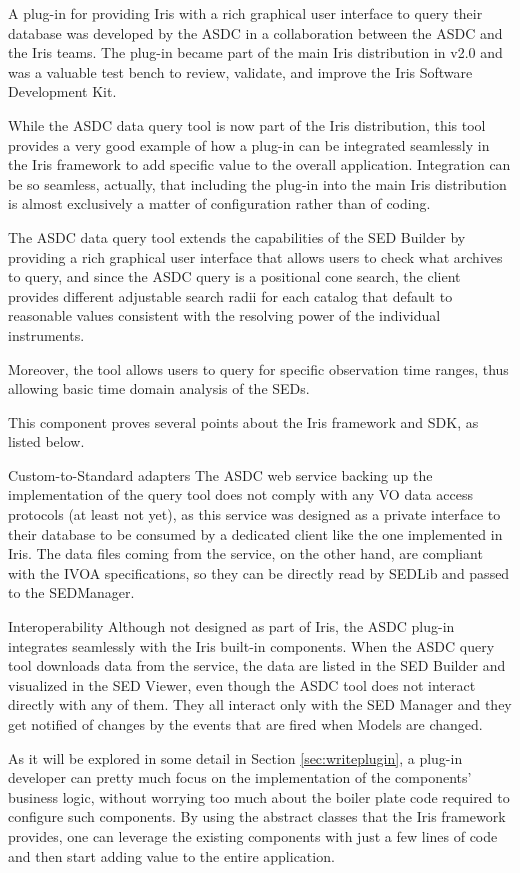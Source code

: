 \documentclass[preprint,authoryear,5p]{elsarticle}
\begin{document}
A plug-in for providing Iris with a rich graphical user interface to query their
database was developed by the ASDC in a collaboration between the ASDC and the
Iris teams. The plug-in became part of the main Iris distribution in v2.0 and
was a valuable test bench to review, validate, and improve the Iris
Software Development Kit.

While the ASDC data query tool is now part of the Iris distribution, this tool
provides a very good example of how a plug-in can be integrated seamlessly in
the Iris framework to add specific value to the overall application.
Integration can be so seamless,
actually, that including the plug-in into the main Iris distribution is almost
exclusively a matter of configuration rather than of coding.

The ASDC data query tool extends the capabilities of the SED Builder by
providing a rich graphical user interface that allows users to check what
archives to query, and since the ASDC query is a positional cone search, the
client provides different adjustable search radii for each catalog that default
to reasonable values consistent with the resolving power of the individual
instruments.

Moreover, the tool allows users to query for specific observation time ranges, thus
allowing basic time domain analysis of the SEDs.

This component proves several points about the Iris framework and SDK, as listed below.
\begin{description} \begin{sloppypar}
\item[Custom-to-Standard adapters] The ASDC web service
backing up the implementation of the query tool does not comply with any VO data
access protocols (at least not yet), as this service was designed as a private interface
to their database to be consumed by a dedicated client like the one implemented in
Iris. The data files coming from the service, on the other hand, are compliant
with the IVOA specifications, so they can be directly read by SEDLib and passed
to the SEDManager.
  \item[Interoperability] Although not
designed as part of Iris, the ASDC plug-in integrates seamlessly with the Iris built-in
components. When the ASDC query tool downloads data from the service, the data
are listed in the SED Builder and visualized in the SED Viewer, even though the
ASDC tool
does not interact directly with any of them. They all interact only with the SED
Manager and they get notified of changes by the events that are fired when
Models are changed.\end{sloppypar}  \item[The Iris SDK] As it will be explored in some detail
in Section \ref{sec:writeplugin}, a plug-in developer can pretty much focus on
the implementation of the components' business logic, without worrying too much
about the boiler plate code required to configure such components. By using the
abstract classes that the Iris framework provides, one can leverage the existing
components with just a few lines of code and then start adding value to the
entire application.  \end{description}
\end{document}
